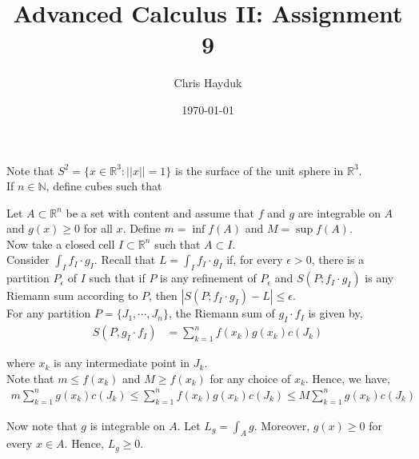 \documentclass[12pt]{article}
\newenvironment{problem}[2][Problem]{\begin{trivlist}
\item[\hskip \labelsep {\bfseries #1}\hskip \labelsep {\bfseries #2.}]}{\end{trivlist}}
\begin{document}
\title{Advanced Calculus II: Assignment 9}

\author{Chris Hayduk}
\date{\today}

\maketitle

\begin{problem}{1}
\end{problem}

Note that $S^2 = \{x \in \mathbb{R}^3: ||x|| = 1\}$ is the surface of the unit sphere in $\mathbb{R}^3$.\\

If $n \in \mathbb{N}$, define cubes such that 

\begin{problem}{2}
\end{problem}

Let $A \subset \mathbb{R}^n$ be a set with content and assume that $f$ and $g$ are integrable on $A$ and $g(x) \geq 0$ for all $x$. Define $m = \inf f(A)$ and $M = \sup f(A)$.\\

Now take a closed cell $I \subset \mathbb{R}^n$ such that $A \subset I$.\\

Consider $\int_I f_I \cdot g_I$. Recall that $L = \int_I f_I \cdot g_I$ if, for every $\epsilon > 0$, there is a partition $P_{\epsilon}$ of $I$ such that if $P$ is any refinement of $P_{\epsilon}$ and $S(P; f_I \cdot g_I)$ is any Riemann sum according to $P$, then $|S(P; f_I \cdot g_I) - L| \leq \epsilon$.\\

For any partition $P = \{J_1, \cdots, J_n\}$, the Riemann sum of $g_I \cdot f_I$ is given by,
\begin{align*}
S(P, g_I \cdot f_I) &= \sum_{k=1}^n f(x_k) g(x_k) c(J_k)
\end{align*}

where $x_k$ is any intermediate point in $J_k$.\\

Note that $m \leq f(x_k)$ and $M \geq f(x_k)$ for any choice of $x_k$. Hence, we have,
\begin{align}
m \sum_{k=1}^n  g(x_k) c(J_k) \leq \sum_{k=1}^n f(x_k)  g(x_k) c(J_k) \leq M \sum_{k=1}^n g(x_k) c(J_k)
\end{align}

Now note that $g$ is integrable on $A$. Let $L_g = \int_A g$. Moreover, $g(x) \geq 0$ for every $x \in A$. Hence, $L_g \geq 0$.\\
\end{document}
